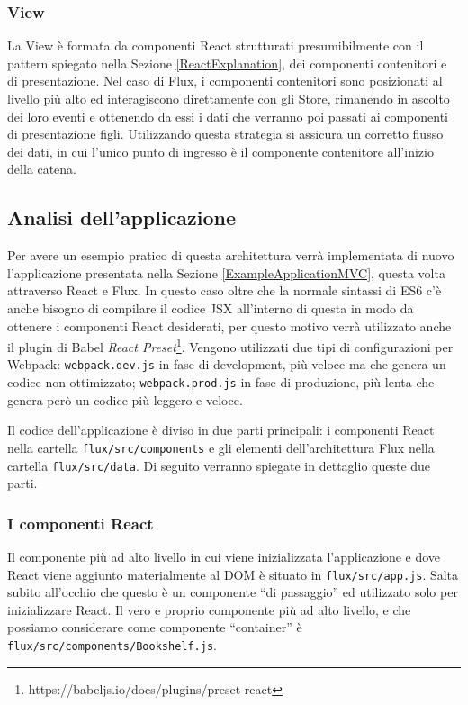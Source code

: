 \subsubsection*{View}
La View è formata da componenti React strutturati presumibilmente con il pattern spiegato nella Sezione \ref{ReactExplanation}, dei componenti contenitori e di presentazione. Nel caso di Flux, i componenti contenitori sono posizionati al livello più alto ed interagiscono direttamente con gli Store, rimanendo in ascolto dei loro eventi e ottenendo da essi i dati che verranno poi passati ai componenti di presentazione figli.
Utilizzando questa strategia si assicura un corretto flusso dei dati, in cui l'unico punto di ingresso è il componente contenitore all'inizio della catena.

\subsection{Analisi dell'applicazione}
\label{FluxApplication}
Per avere un esempio pratico di questa architettura verrà implementata di nuovo l'applicazione presentata nella Sezione \ref{ExampleApplicationMVC}, questa volta attraverso React e Flux.
In questo caso oltre che la normale sintassi di ES6 c'è anche bisogno di compilare il codice JSX all'interno di questa in modo da ottenere i componenti React desiderati, per questo motivo verrà utilizzato anche il plugin di Babel \textit{React Preset}\footnote{https://babeljs.io/docs/plugins/preset-react}.
Vengono utilizzati due tipi di configurazioni per Webpack: \texttt{webpack.dev.js} in fase di development, più veloce ma che genera un codice non ottimizzato; \texttt{webpack.prod.js} in fase di produzione, più lenta che genera però un codice più leggero e veloce.

Il codice dell'applicazione è diviso in due parti principali: i componenti React nella cartella \texttt{flux/src/components} e gli elementi dell'architettura Flux nella cartella \texttt{flux/src/data}. Di seguito verranno spiegate in dettaglio queste due parti.

\subsubsection*{I componenti React}
Il componente più ad alto livello in cui viene inizializzata l'applicazione e dove React viene aggiunto materialmente al DOM è situato in \texttt{flux/src/app.js}. Salta subito all'occhio che questo è un componente “di passaggio” ed utilizzato solo per inizializzare React. Il vero e proprio componente più ad alto livello, e che possiamo considerare come componente “container” è \texttt{flux/src/components/Bookshelf.js}.

